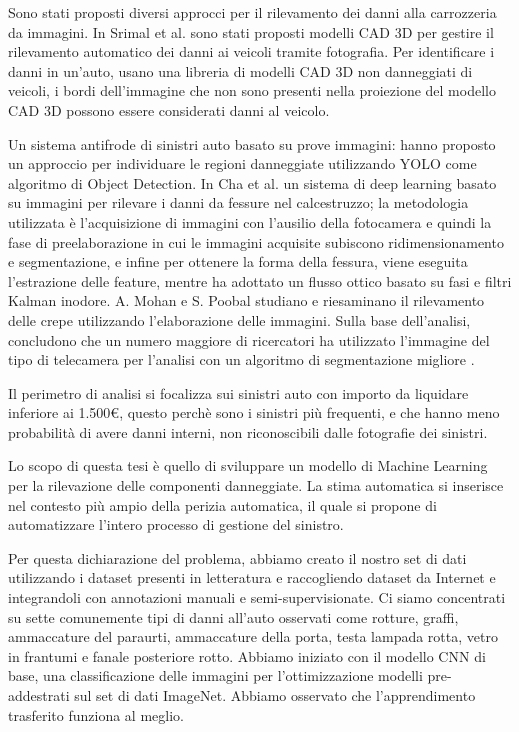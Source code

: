 Sono stati proposti diversi approcci per il rilevamento dei danni alla carrozzeria da immagini. In Srimal et al. \cite{jayawardena2013image} sono stati proposti modelli CAD 3D per gestire il rilevamento automatico dei danni ai veicoli tramite fotografia. Per identificare i danni in un'auto, usano una libreria di modelli CAD 3D non danneggiati di veicoli, i bordi dell'immagine che non sono presenti nella proiezione del modello CAD 3D possono essere considerati danni al veicolo. 

Un sistema antifrode di sinistri auto basato su prove immagini: hanno proposto un approccio per individuare le regioni danneggiate utilizzando YOLO come algoritmo di Object Detection. In Cha et al. \cite{cha2017deep} un sistema di deep learning basato su immagini per rilevare i danni da fessure nel calcestruzzo; la metodologia utilizzata è l'acquisizione di immagini con l'ausilio della fotocamera e quindi la fase di preelaborazione in cui le immagini acquisite subiscono ridimensionamento e segmentazione, e infine per ottenere la forma della fessura, viene eseguita l'estrazione delle feature, mentre \cite{cha2017output} ha adottato un flusso ottico basato su fasi e filtri Kalman inodore. A. Mohan e S. Poobal studiano e riesaminano il rilevamento delle crepe utilizzando l'elaborazione delle immagini. Sulla base dell'analisi, concludono che un numero maggiore di ricercatori ha utilizzato l'immagine del tipo di telecamera per l'analisi con un algoritmo di segmentazione migliore \cite{mohan2018crack}.


Il perimetro di analisi si focalizza sui sinistri auto con importo da liquidare inferiore ai 1.500€, questo perchè sono i sinistri più frequenti, e che hanno meno probabilità di avere danni interni, non riconoscibili dalle fotografie dei sinistri.

Lo scopo di questa tesi è quello di sviluppare un modello di Machine Learning per la rilevazione delle componenti danneggiate.
La stima automatica si inserisce nel contesto più ampio della perizia automatica, il quale si propone di automatizzare l'intero processo di gestione del sinistro. 

Per questa dichiarazione del problema, abbiamo creato il nostro set di dati utilizzando i dataset presenti in letteratura e raccogliendo dataset da Internet e integrandoli con annotazioni manuali e semi-supervisionate. Ci siamo concentrati su sette comunemente tipi di danni all'auto osservati come rotture, graffi, ammaccature del paraurti, ammaccature della porta, testa lampada rotta, vetro in frantumi e fanale posteriore rotto. Abbiamo iniziato con il modello CNN di base, una classificazione delle immagini per l'ottimizzazione modelli pre-addestrati sul set di dati ImageNet. Abbiamo osservato che l'apprendimento trasferito funziona al meglio. 

